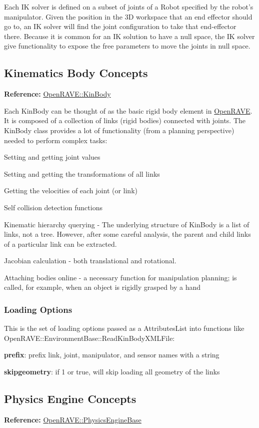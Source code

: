 Each IK solver is defined on a subset of joints of a Robot specified by the robot's manipulator. Given the position in the 3D workspace that an end effector should go to, an IK solver will find the joint configuration to take that end-\/effector there. Because it is common for an IK solution to have a null space, the IK solver give functionality to expose the free parameters to move the joints in null space. \hypertarget{arch_kinbody}{}\subsection{Kinematics Body Concepts}\label{arch_kinbody}
{\bfseries Reference:} \hyperlink{classOpenRAVE_1_1KinBody}{OpenRAVE::KinBody}

Each KinBody can be thought of as the basic rigid body element in \hyperlink{namespaceOpenRAVE}{OpenRAVE}. It is composed of a collection of links (rigid bodies) connected with joints. The KinBody class provides a lot of functionality (from a planning perspective) needed to perform complex tasks:


\begin{DoxyItemize}
\item Setting and getting joint values
\item Setting and getting the transformations of all links
\item Getting the velocities of each joint (or link)
\item Self collision detection functions
\item Kinematic hierarchy querying -\/ The underlying structure of KinBody is a list of links, not a tree. However, after some careful analysis, the parent and child links of a particular link can be extracted.
\item Jacobian calculation -\/ both translational and rotational.
\item Attaching bodies online -\/ a necessary function for manipulation planning; is called, for example, when an object is rigidly grasped by a hand
\end{DoxyItemize}\hypertarget{arch__kinbody_arch_kinbody_options}{}\subsubsection{Loading Options}\label{arch__kinbody_arch_kinbody_options}
This is the set of loading options passed as a AttributesList into functions like OpenRAVE::EnvironmentBase::ReadKinBodyXMLFile:
\begin{DoxyItemize}
\item {\bfseries prefix}: prefix link, joint, manipulator, and sensor names with a string
\item {\bfseries skipgeometry}: if 1 or true, will skip loading all geometry of the links 
\end{DoxyItemize}\hypertarget{arch_physicsengine}{}\subsection{Physics Engine Concepts}\label{arch_physicsengine}
{\bfseries Reference:} \hyperlink{classOpenRAVE_1_1PhysicsEngineBase}{OpenRAVE::PhysicsEngineBase}

